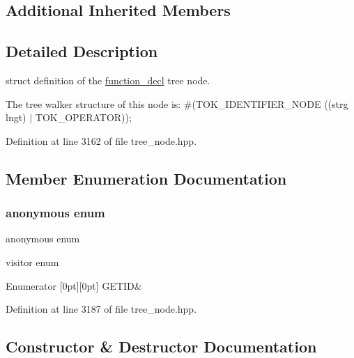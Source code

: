 \subsection*{Additional Inherited Members}


\subsection{Detailed Description}
struct definition of the \hyperlink{structfunction__decl}{function\+\_\+decl} tree node. 

The tree walker structure of this node is\+: \#(T\+O\+K\+\_\+\+I\+D\+E\+N\+T\+I\+F\+I\+E\+R\+\_\+\+N\+O\+DE ((strg lngt) $\vert$ T\+O\+K\+\_\+\+O\+P\+E\+R\+A\+T\+OR)); 

Definition at line 3162 of file tree\+\_\+node.\+hpp.



\subsection{Member Enumeration Documentation}
\mbox{\label{structidentifier__node_aab43b68bbc7d3eebefc80cf928aba0e2}} 
\subsubsection{\texorpdfstring{anonymous enum}{anonymous enum}}
{\footnotesize\ttfamily anonymous enum}



visitor enum 

\begin{DoxyEnumFields}{Enumerator}
[0pt][0pt]{}\mbox{\label{structidentifier__node_aab43b68bbc7d3eebefc80cf928aba0e2a7e1e268c95426a86bc297b0e3585d722}} 
G\+E\+T\+ID&\\
\hline

\end{DoxyEnumFields}


Definition at line 3187 of file tree\+\_\+node.\+hpp.



\subsection{Constructor \& Destructor Documentation}
\mbox{\label{structidentifier__node_a8e3b4af31cd20552bf425dcdd680baa3}} 
